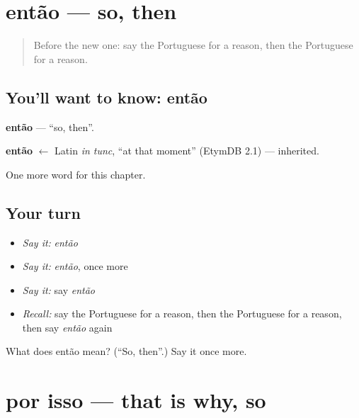\section[então]{então — so, then}

\label{lesson:PT-C84-entao}



\begin{quote}
Before the new one: say the Portuguese for a reason, then the Portuguese for a reason.
\end{quote}

\subsection*{You'll want to know: então}
\textbf{então} — \textquotedblleft{}so, then\textquotedblright{}.

\begin{cousinweb}
\textbf{então} $\leftarrow$ Latin \emph{in tunc}, \textquotedblleft{}at that moment\textquotedblright{} (EtymDB 2.1) — inherited.
\end{cousinweb}

\begin{grammarlens}[title={What you've built}]
One more word for this chapter.
\end{grammarlens}

\subsection*{Your turn}
\begin{itemize}
\raggedright
  \item \emph{Say it:} \emph{então}
  \item \emph{Say it:} \emph{então}, once more
  \item \emph{Say it:} say \emph{então}
  \item \emph{Recall:} say the Portuguese for a reason, then the Portuguese for a reason, then say \emph{então} again
\end{itemize}

\begin{tcolorbox}[breakable,colback=teal!4,colframe=teal!35!black,title={Before you move on}]
What does então mean? (\textquotedblleft{}So, then\textquotedblright{}.) Say it once more.
\end{tcolorbox}
\section[por isso]{por isso — that is why, so}

